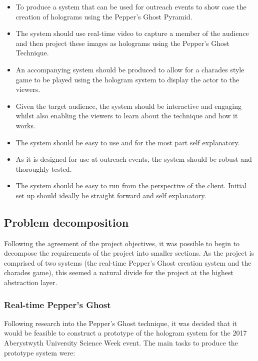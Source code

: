 \begin{itemize}
	\item To produce a system that can be used for outreach events to show case the creation of holograms using the Pepper's Ghost Pyramid.
	
	\item The system should use real-time video to capture a member of the audience and then project these images as holograms using the Pepper's Ghost Technique.
	
	\item An accompanying system should be produced to allow for a charades style game to be played using the hologram system to display the actor to the viewers.
	
	\item Given the target audience, the system should be interactive and engaging whilst also enabling the viewers to learn about the technique and how it works.
	
	\item The system should be easy to use and for the most part self explanatory.
	
	\item As it is designed for use at outreach events, the system should be robust and thoroughly tested.
	
	\item The system should be easy to run from the perspective of the client. Initial set up should ideally be straight forward and self explanatory.
\end{itemize}


\subsection{Problem decomposition}
Following the agreement of the project objectives, it was possible to begin to decompose the requirements of the project into smaller sections. As the project is comprised of two systems (the real-time Pepper's Ghost creation system and the charades game), this seemed a natural divide for the project at the highest abstraction layer.

\subsubsection{Real-time Pepper's Ghost}
Following research into the Pepper's Ghost technique, it was decided that it would be feasible to construct a prototype of the hologram system for the 2017 Aberystwyth University Science Week event. The main tasks to produce the prototype system were:

